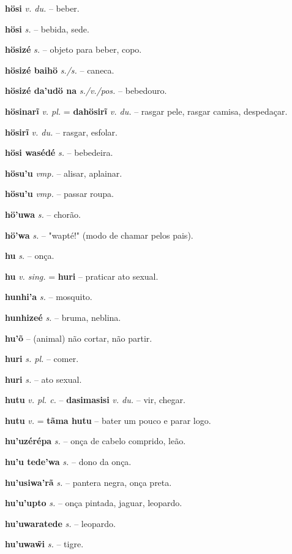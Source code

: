 \textbf{hösi} \textit{v. du.} -- beber.

\textbf{hösi} \textit{s.} -- bebida, sede.

\textbf{hösizé} \textit{s.} -- objeto para beber, copo.

\textbf{hösizé baihö} \textit{s./s.} -- caneca.

\textbf{hösizé da'udö na} \textit{s./v./pos.} -- bebedouro.

\textbf{hösinarĩ} \textit{v. pl.} = \textbf{dahösirĩ} \textit{v. du.} -- rasgar pele, rasgar camisa, despedaçar.

\textbf{hösirĩ} \textit{v. du.} -- rasgar, esfolar.

\textbf{hösi wasédé} \textit{s.} -- bebedeira.

\textbf{hösu'u} \textit{vmp.} -- alisar, aplainar.

\textbf{hösu'u} \textit{vmp.} -- passar roupa.

\textbf{hö'uwa} \textit{s.} -- chorão.

\textbf{hö'wa} \textit{s.} -- "wapté!" (modo de chamar pelos pais).

\textbf{hu} \textit{s.} -- onça.

\textbf{hu} \textit{v. sing.} = \textbf{huri} -- praticar ato sexual.

\textbf{hunhi'a} \textit{s.} -- mosquito.

\textbf{hunhizeé} \textit{s.} -- bruma, neblina.

\textbf{hu'õ} -- (animal) não cortar, não partir.

\textbf{huri} \textit{s. pl.} -- comer.

\textbf{huri} \textit{s.} -- ato sexual.

\textbf{hutu} \textit{v. pl. c.} -- \textbf{dasimasisi} \textit{v. du.} -- vir, chegar.

\textbf{hutu} \textit{v.} = \textbf{tãma hutu} -- bater um pouco e parar logo.

\textbf{hu'uzérépa} \textit{s.} -- onça de cabelo comprido, leão.

\textbf{hu'u tede'wa} \textit{s.} -- dono da onça.

\textbf{hu'usiwa'rã} \textit{s.} -- pantera negra, onça preta.

\textbf{hu'u'upto} \textit{s.} -- onça pintada, jaguar, leopardo.

\textbf{hu'uwaratede} \textit{s.} -- leopardo.

\textbf{hu'uwaw̃i} \textit{s.} -- tigre.



